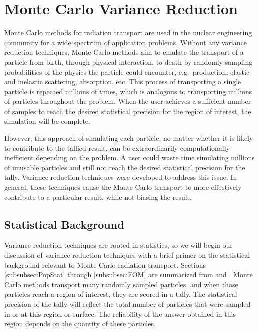 \section{Monte Carlo Variance Reduction}
\label{sec:MCvar}

Monte Carlo methods for radiation transport are used in the nuclear
engineering community for a wide spectrum of application problems. Without any
variance reduction techniques, Monte Carlo methods aim to emulate
the transport of a particle from birth, through physical interaction, to death
by randomly sampling probabilities of the physics the particle could encounter, e.g.\ production, elastic and inelastic
scattering, absorption, etc.
This process of transporting a single particle
is repeated millions of times, which is analogous to transporting
millions of particles throughout the problem. When the user achieves a
sufficient
number of samples to reach the desired statistical precision for
the region of interest, the
simulation will be complete. 

However, this approach of simulating each
particle, no matter whether it is likely to contribute to the tallied result,
can be extraordinarily computationally inefficient depending on the problem. A
user could waste time simulating millions of unusable particles and still not
reach the desired statistical precision for the tally. Variance
reduction techniques were developed to address this issue. In general, these
techniques cause the Monte Carlo transport to more effectively
contribute to a particular result, while not biasing the result.

\subsection{Statistical Background}
\label{subsec:StatBkgnd}

Variance reduction techniques are rooted in statistics, so we will begin our
discussion of variance reduction techniques with a brief primer on the
statistical background relevant to Monte Carlo radiation transport. Sections
\ref{subsubsec:PopStat} through \ref{subsubsec:FOM} are summarized from
\cite{lewis_computational_1984} and \cite{mcnp_manual_v1}.
Monte Carlo
methods transport many randomly sampled
particles, and when those particles reach a region of interest, they are scored
in a tally. The statistical precision of the tally
will reflect the total number of particles that were sampled in or at this
region or surface.
The reliability of the answer obtained in this region depends
on the quantity of these particles.

